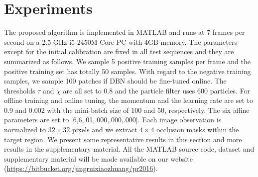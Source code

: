 \documentclass[preprint,12pt,review]{elsarticle}
\begin{document}
\section{Experiments}
The proposed algorithm is implemented in MATLAB and runs at 7 frames per second on a 2.5 GHz i5-2450M Core PC with 4GB memory.
%
The parameters except for the initial calibration are fixed in all test sequences and they are summarized as follows.
%
We sample 5 positive training samples per frame and the positive training set has totally 50 samples.
%
With regard to the negative training samples, we sample 100 patches if DBN should be fine-tuned online.
%
The thresholds $ \tau $ and $\chi$ are all set to 0.8 and the particle filter uses 600 particles.
%
For offline training and online tuning, the momentum and the learning rate are set to 0.9 and 0.002 with the mini-batch size of 100 and 50, respectively.
%
The six affine parameters are set to [6,6,.01,.000,.000,.000].
%
Each image observation is normalized to $32 \times 32$ pixels and we extract $4 \times 4$ occlusion masks within the target region.
%
We present some representative results in this section and more results in the supplementary material.
%
All the MATLAB source code, dataset and supplementary material will be made available on
our website ({\small {\url{https://bitbucket.org/jingruixiaozhuang/pr2016}}}).
\end{document}
